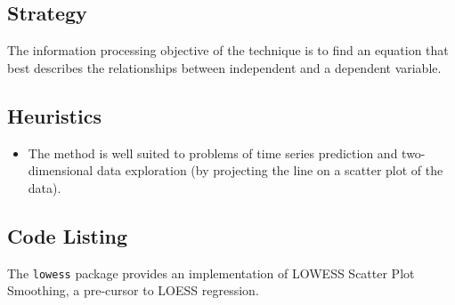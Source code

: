\subsection{Strategy}
The information processing objective of the technique is to find an equation that best describes the relationships between independent and a dependent variable.


\subsection{Heuristics}

\begin{itemize}
	\item The method is well suited to problems of time series prediction and two-dimensional data exploration (by projecting the line on a scatter plot of the data).
\end{itemize}


\subsection{Code Listing}


The \texttt{lowess} package provides an implementation of LOWESS Scatter Plot Smoothing, a pre-cursor to LOESS regression.

